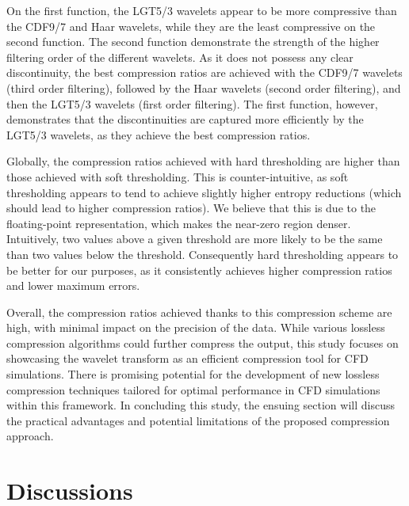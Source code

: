 On the first function, the LGT5/3 wavelets appear to be more compressive than the CDF9/7 and Haar wavelets, while they are the least compressive on the second function.
The second function demonstrate the strength of the higher filtering order of the different wavelets.
As it does not possess any clear discontinuity, the best compression ratios are achieved with the CDF9/7 wavelets (third order filtering), followed by the Haar wavelets (second order filtering), and then the LGT5/3 wavelets (first order filtering).
The first function, however, demonstrates that the discontinuities are captured more efficiently by the LGT5/3 wavelets, as they achieve the best compression ratios.

Globally, the compression ratios achieved with hard thresholding are higher than those achieved with soft thresholding.
This is counter-intuitive, as soft thresholding appears to tend to achieve slightly higher entropy reductions (which should lead to higher compression ratios).
We believe that this is due to the floating-point representation, which makes the near-zero region denser.
Intuitively, two values above a given threshold are more likely to be the same than two values below the threshold.
Consequently hard thresholding appears to be better for our purposes, as it consistently achieves higher compression ratios and lower maximum errors.

Overall, the compression ratios achieved thanks to this compression scheme are high, with minimal impact on the precision of the data.
While various lossless compression algorithms could further compress the output, this study focuses on showcasing the wavelet transform as an efficient compression tool for CFD simulations.
There is promising potential for the development of new lossless compression techniques tailored for optimal performance in CFD simulations within this framework.
In concluding this study, the ensuing section will discuss the practical advantages and potential limitations of the proposed compression approach.

\section{Discussions} \label{sec:discussions}


